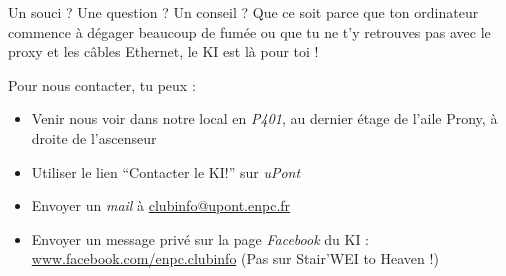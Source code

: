 \documentclass{../templates/enpc-ki/ki020}
\begin{document}
    Un souci ? Une question ? Un conseil ? Que ce soit parce que ton ordinateur commence à dégager beaucoup de fumée ou que tu ne t’y retrouves pas avec le proxy et les câbles Ethernet, le KI est là pour toi !

    Pour nous contacter, tu peux :
\begin{itemize}
  \item Venir nous voir dans notre local en \emph{P401}, au dernier étage de l’aile Prony, à droite de l’ascenseur
  \item Utiliser le lien “Contacter le KI!” sur \emph{uPont}
  \item Envoyer un \emph{mail} à \href{mailto:clubinfo@upont.enpc.fr}{clubinfo@upont.enpc.fr}
  \item Envoyer un message privé sur la page \emph{Facebook} du KI : \\ \href{www.facebook.com/enpc.clubinfo}{www.facebook.com/enpc.clubinfo} (Pas sur Stair'WEI to Heaven !)
\end{itemize}
\end{document}
